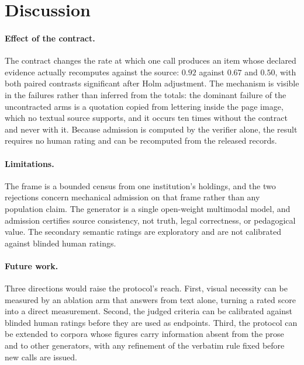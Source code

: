 \section{Discussion}
\label{sec:discussion}

\paragraph{Effect of the contract.}
The contract changes the rate at which one call produces an item whose
declared evidence actually recomputes against the source: $0.92$
against $0.67$ and $0.50$, with both paired contrasts significant
after Holm adjustment. The mechanism is visible in the failures rather than
inferred from the totals: the dominant failure of the uncontracted arms
is a quotation copied from lettering inside the page image, which no
textual source supports, and it occurs ten times without the contract
and never with it. Because admission is computed by the verifier alone,
the result requires no human rating and can be recomputed from the
released records.

\paragraph{Limitations.}
The frame is a bounded census from one institution's holdings, and the
two rejections concern mechanical admission on that frame rather than
any population claim. The generator is a single open-weight multimodal
model, and admission certifies source consistency, not truth, legal
correctness, or pedagogical value. The secondary semantic ratings are
exploratory and are not calibrated against blinded human ratings.

\paragraph{Future work.}
Three directions would raise the protocol's reach. First, visual
necessity can be measured by an ablation arm that answers from text
alone, turning a rated score into a direct measurement. Second, the
judged criteria can be calibrated against blinded human ratings before
they are used as endpoints. Third, the protocol can be extended to corpora whose figures carry
information absent from the prose and to other generators, with any
refinement of the verbatim rule fixed before new calls are issued.
